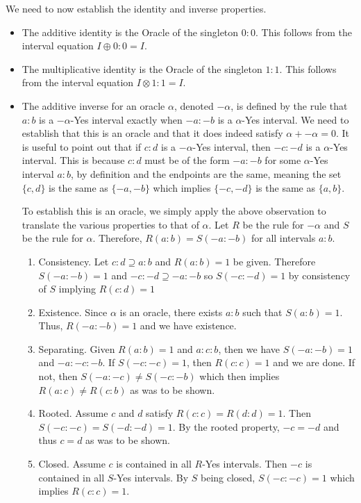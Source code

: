 \documentclass[12pt]{article}
\theoremstyle{remark}
\begin{document}
We need to now establish the identity and inverse properties. 

\begin{itemize}
    \item The additive identity is the Oracle of the singleton $0:0$. This follows from the interval equation $I \oplus 0:0 = I$.
    \item The multiplicative identity is the Oracle of the singleton $1:1$. This follows from the interval equation $I \otimes 1:1 = I$.
    \item The additive inverse for an oracle $\alpha$, denoted $-\alpha$, is defined by the rule that $a:b$ is a $-\alpha$-Yes interval exactly when $-a:-b$ is a $\alpha$-Yes interval. We need to establish that this is an oracle and that it does indeed satisfy $\alpha + -\alpha = 0$. 
    It is useful to point out that if $c:d$ is a $-\alpha$-Yes interval, then $-c:-d$ is a $\alpha$-Yes interval. This is because $c:d$ must be of the form $-a:-b$ for some $\alpha$-Yes interval $a:b$, by definition and the endpoints are the same, meaning the set $\{c,d\}$ is the same as $\{-a, -b\}$ which implies $\{-c, -d\}$ is the same as $\{a, b\}$.
    
    To establish this is an oracle, we simply apply the above observation to translate the various properties to that of $\alpha$. Let $R$ be the rule for $-\alpha$ and $S$ be the rule for $\alpha$. Therefore, $R(a:b)=S(-a:-b)$ for all intervals $a:b$.
    
    \begin{enumerate}
        \item Consistency. Let $c:d \supseteq a:b$ and $R(a:b)=1$ be given. Therefore $S(-a:-b) = 1$ and $-c:-d \supseteq -a:-b$ so $S(-c:-d)=1$ by consistency of $S$ implying $R(c:d) = 1$
        \item Existence. Since $\alpha$ is an oracle, there exists $a:b$ such that $S(a:b)=1$. Thus, $R(-a:-b)=1$ and we have existence. 
        \item Separating. Given $R(a:b)=1$ and $a:c:b$, then we have $S(-a:-b)=1$ and $-a:-c:-b$. If $S(-c:-c)=1$, then $R(c:c)=1$ and we are done. If not, then $S(-a:-c) \neq S(-c:-b)$ which then implies $R(a:c)\neq R(c:b)$ as was to be shown. 
        \item Rooted. Assume $c$ and $d$ satisfy $R(c:c)=R(d:d)=1$. Then $S(-c:-c)=S(-d:-d)=1$. By the rooted property, $-c = -d$ and thus $c=d$ as was to be shown. 
        \item Closed. Assume $c$ is contained in all $R$-Yes intervals. Then $-c$ is contained in all $S$-Yes intervals. By $S$ being closed, $S(-c:-c)=1$ which implies $R(c:c)=1$.
    \end{enumerate}
    

\end{itemize}
\end{document}
